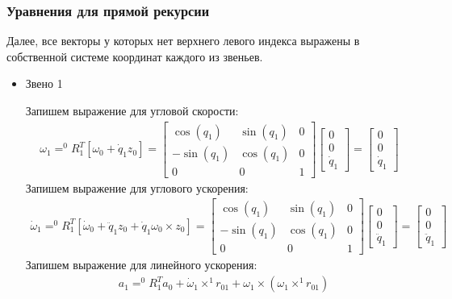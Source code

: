 \documentclass[a4paper,14pt]{extreport}
\begin{document}
\subsubsection{Уравнения для прямой рекурсии}
Далее, все векторы у которых нет верхнего левого индекса выражены в собственной системе координат каждого из звеньев.
\begin{itemize}
\item Звено 1

Запишем выражение для угловой скорости:
\begin{align*}
\omega_1 = ^0R_1^T [\omega_0 + \dot q_1 z_0] =
\left[
\begin{matrix}\cos{\left (q_{1} \right )} & \sin{\left (q_{1} \right )} & 0\\- \sin{\left (q_{1} \right )} & \cos{\left (q_{1} \right )} & 0\\0 & 0 & 1
\end{matrix}
\right]
\left[\begin{matrix}0\\0\\\dot{q}_1\end{matrix}\right] = 
\left[\begin{matrix}0\\0\\\dot{q}_1\end{matrix}\right]
\end{align*}
Запишем выражение для углового ускорения:
\begin{align*}
\dot \omega_1 = ^0R_1^T [\dot \omega_0 + \ddot q_1 z_0 + \dot q_1 \omega_0 \times z_0] = 
\left[
\begin{matrix}\cos{\left (q_{1} \right )} & \sin{\left (q_{1} \right )} & 0\\- \sin{\left (q_{1} \right )} & \cos{\left (q_{1} \right )} & 0\\0 & 0 & 1
\end{matrix}
\right]
\left[\begin{matrix}0\\0\\\ddot{q}_1\end{matrix}\right]
=
\left[\begin{matrix}0\\0\\\ddot{q}_1\end{matrix}\right]
\end{align*}
Запишем выражение для линейного ускорения:
\begin{align*}
&a_1 = ^0R_1^T a_0 + \dot \omega_1 \times ^1r_{01} + \omega_1 \times (\omega_1 \times ^1r_{01})

\end{align*}
\end{itemize}
\end{document}

